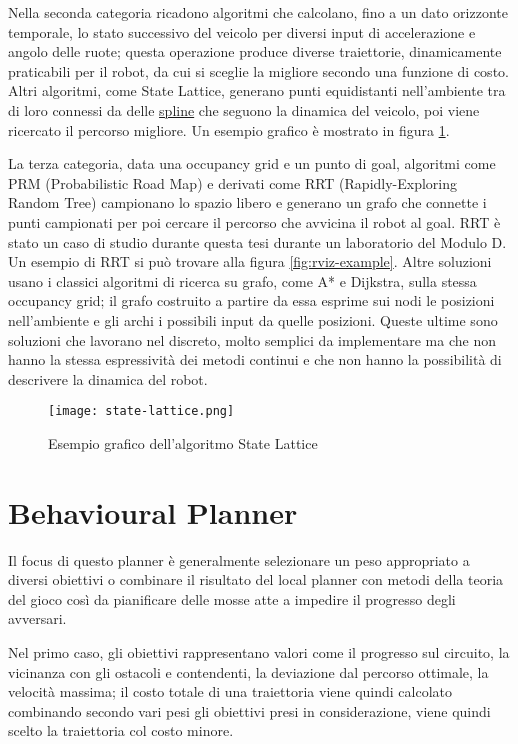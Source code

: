 Nella seconda categoria ricadono algoritmi che calcolano, fino a un dato orizzonte temporale, lo stato
successivo del veicolo per diversi input di accelerazione e angolo delle ruote; questa operazione produce
diverse traiettorie, dinamicamente praticabili per il robot, da cui si sceglie la migliore secondo una
funzione di costo. Altri algoritmi, come State Lattice, generano punti equidistanti nell'ambiente tra di
loro connessi da delle \hyperref[par:spline-def]{spline} che seguono la dinamica del veicolo, poi viene
ricercato il percorso migliore. Un esempio grafico è mostrato in figura \ref{fig:state-lattice}.

La terza categoria, data una occupancy grid e un punto di goal, algoritmi come PRM (Probabilistic Road
Map) e derivati come RRT (Rapidly-Exploring Random Tree) campionano lo spazio libero e generano un grafo
che connette i punti campionati per poi cercare il percorso che avvicina il robot al goal. RRT è stato un
caso di studio durante questa tesi durante un laboratorio del Modulo D. Un esempio di RRT si può trovare
alla figura \ref{fig:rviz-example}. Altre soluzioni usano i classici algoritmi di ricerca su grafo, come
A* e Dijkstra, sulla stessa occupancy grid; il grafo costruito a partire da essa esprime sui nodi le posizioni
nell'ambiente e gli archi i possibili input da quelle posizioni. Queste ultime sono soluzioni che
lavorano nel discreto, molto semplici da implementare ma che non hanno la stessa espressività dei metodi
continui e che non hanno la possibilità di descrivere la dinamica del robot.

\begin{figure}[h]
	\begin{center}
		\texttt{[image: state-lattice.png]}
	\end{center}
	\caption{Esempio grafico dell'algoritmo State Lattice \cite{state-lattice}}
	\label{fig:state-lattice}
\end{figure}

\section{Behavioural Planner}
Il focus di questo planner è generalmente selezionare un peso appropriato a diversi obiettivi o combinare
il risultato del local planner con metodi della teoria del gioco così da pianificare delle mosse atte a
impedire il progresso degli avversari.

Nel primo caso, gli obiettivi rappresentano valori come il progresso sul circuito, la vicinanza con gli
ostacoli e contendenti, la deviazione dal percorso ottimale, la velocità massima; il costo totale di una
traiettoria viene quindi calcolato combinando secondo vari pesi gli obiettivi presi in considerazione,
viene quindi scelto la traiettoria col costo minore.

